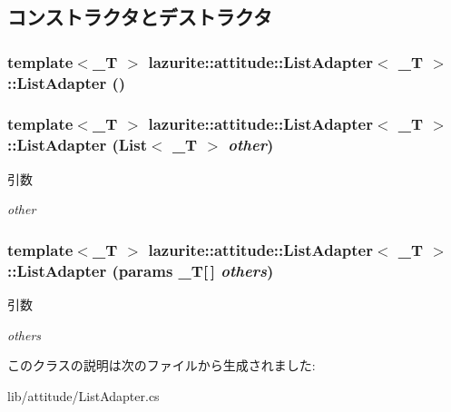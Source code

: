 \subsection{コンストラクタとデストラクタ}
\hypertarget{classlazurite_1_1attitude_1_1_list_adapter_3_01___t_01_4_a739410b3db43b13876a5b7f9b63b8d5e}{
\subsubsection[{ListAdapter}]{\setlength{\rightskip}{0pt plus 5cm}template$<$\_\-T $>$ lazurite::attitude::ListAdapter$<$ \_\-T $>$::ListAdapter ()}}
\label{classlazurite_1_1attitude_1_1_list_adapter_3_01___t_01_4_a739410b3db43b13876a5b7f9b63b8d5e}
\hypertarget{classlazurite_1_1attitude_1_1_list_adapter_3_01___t_01_4_a48c9bd58a80520924504437a1b5f2dab}{
\subsubsection[{ListAdapter}]{\setlength{\rightskip}{0pt plus 5cm}template$<$\_\-T $>$ lazurite::attitude::ListAdapter$<$ \_\-T $>$::ListAdapter (List$<$ \_\-T $>$ {\em other})}}
\label{classlazurite_1_1attitude_1_1_list_adapter_3_01___t_01_4_a48c9bd58a80520924504437a1b5f2dab}

\begin{DoxyParams}{引数}
\item[{\em other}]\end{DoxyParams}
\hypertarget{classlazurite_1_1attitude_1_1_list_adapter_3_01___t_01_4_aec37194e4a0f8fbec76e44447e330fd8}{
\subsubsection[{ListAdapter}]{\setlength{\rightskip}{0pt plus 5cm}template$<$\_\-T $>$ lazurite::attitude::ListAdapter$<$ \_\-T $>$::ListAdapter (params \_\-T\mbox{[}$\,$\mbox{]} {\em others})}}
\label{classlazurite_1_1attitude_1_1_list_adapter_3_01___t_01_4_aec37194e4a0f8fbec76e44447e330fd8}

\begin{DoxyParams}{引数}
\item[{\em others}]\end{DoxyParams}


このクラスの説明は次のファイルから生成されました:\begin{DoxyCompactItemize}
\item 
lib/attitude/ListAdapter.cs\end{DoxyCompactItemize}

